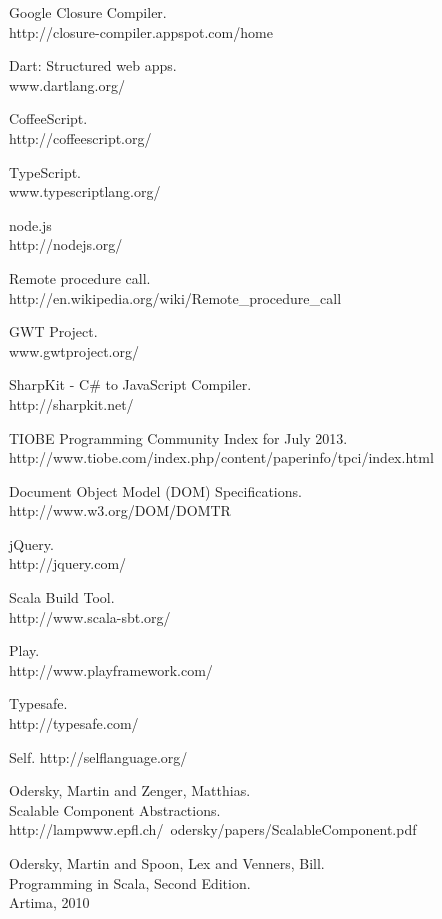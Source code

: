 \begin{thebibliography}{99}
	Google Closure Compiler.\\
	http://closure-compiler.appspot.com/home
	
	Dart: Structured web apps.\\
	www.dartlang.org/
	
	CoffeeScript.\\
	http://coffeescript.org/
	
	TypeScript.\\
	www.typescriptlang.org/
	
	node.js\\
	http://nodejs.org/
	
	Remote procedure call.\\
	http://en.wikipedia.org/wiki/Remote\_procedure\_call
	
	GWT Project.\\
	www.gwtproject.org/
	
	SharpKit - C\# to JavaScript Compiler.\\
	http://sharpkit.net/
	
	TIOBE Programming Community Index for July 2013.\\
	http://www.tiobe.com/index.php/content/paperinfo/tpci/index.html
	
	Document Object Model (DOM) Specifications.\\
	http://www.w3.org/DOM/DOMTR
		
	jQuery.\\
	http://jquery.com/
	
	Scala Build Tool.\\
	http://www.scala-sbt.org/
	
	Play.\\
	http://www.playframework.com/
	
	Typesafe.\\
	http://typesafe.com/
	
	Self.
	http://selflanguage.org/
	
	{\sc Odersky,} Martin and {\sc Zenger,} Matthias.\\
	Scalable Component Abstractions.\\
	http://lampwww.epfl.ch/~odersky/papers/ScalableComponent.pdf
	
	{\sc Odersky,} Martin and {\sc Spoon,} Lex and {\sc Venners,} Bill.\\  Programming in Scala, Second Edition.\\
	Artima, 2010
	

\end{thebibliography}
